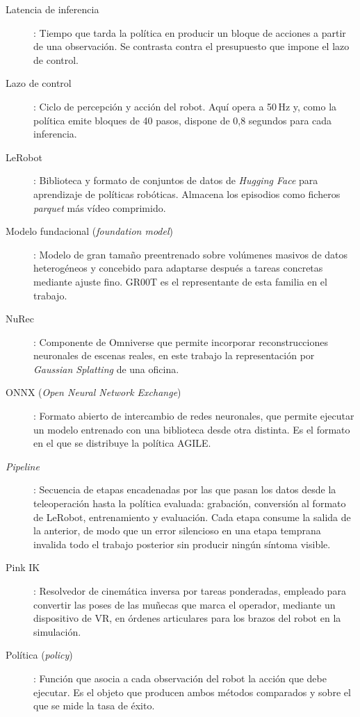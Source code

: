 \begin{description}
	\item[Latencia de inferencia]: Tiempo que tarda la política en producir un bloque de acciones a
	partir de una observación. Se contrasta contra el presupuesto que impone el lazo de control.

	\item[Lazo de control]: Ciclo de percepción y acción del robot. Aquí opera a 50\,Hz y, como la
	política emite bloques de 40 pasos, dispone de 0,8 segundos para cada inferencia.

	\item[LeRobot]: Biblioteca y formato de conjuntos de datos de \textit{Hugging Face} para
	aprendizaje de políticas robóticas. Almacena los episodios como ficheros \textit{parquet} más
	vídeo comprimido.

	\item[Modelo fundacional (\textit{foundation model})]: Modelo de gran tamaño preentrenado sobre
	volúmenes masivos de datos heterogéneos y concebido para adaptarse después a tareas concretas
	mediante ajuste fino. GR00T es el representante de esta familia en el trabajo.

	\item[NuRec]: Componente de Omniverse que permite incorporar reconstrucciones neuronales de
	escenas reales, en este trabajo la representación por \textit{Gaussian Splatting} de una
	oficina.

	\item[ONNX (\textit{Open Neural Network Exchange})]: Formato abierto de intercambio de redes
	neuronales, que permite ejecutar un modelo entrenado con una biblioteca desde otra distinta.
	Es el formato en el que se distribuye la política AGILE.

	\item[\textit{Pipeline}]: Secuencia de etapas encadenadas por las que pasan los datos desde la
	teleoperación hasta la política evaluada: grabación, conversión al formato de
	LeRobot, entrenamiento y evaluación. Cada etapa consume la salida de la anterior, de modo que un error
	silencioso en una etapa temprana invalida todo el trabajo posterior sin producir ningún
	síntoma visible.

	\item[Pink IK]: Resolvedor de cinemática inversa por tareas ponderadas, empleado para convertir
	las poses de las muñecas que marca el operador, mediante un dispositivo de VR, en órdenes
	articulares para los brazos del robot en la simulación.

	\item[Política (\textit{policy})]: Función que asocia a cada observación del robot la acción que
	debe ejecutar. Es el objeto que producen ambos métodos comparados y sobre el que se mide la
	tasa de éxito.


\end{description}
